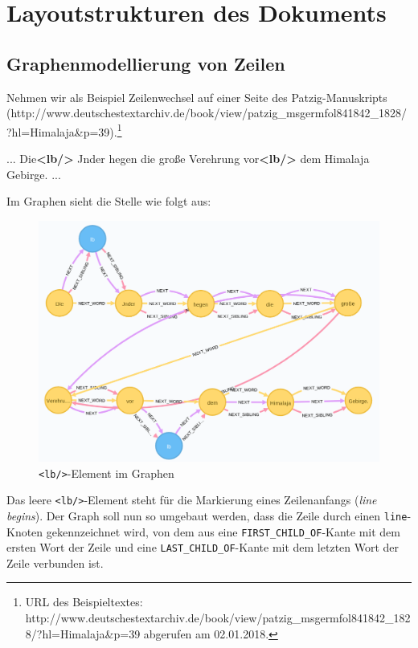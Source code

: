 \documentclass[ngerman,]{scrreprt}
\newenvironment{Shaded}{}{}
\newcommand{\KeywordTok}[1]{\textcolor[rgb]{0.00,0.44,0.13}{\textbf{#1}}}
\newcommand{\NormalTok}[1]{#1}
\begin{document}
\section{Layoutstrukturen des Dokuments}\label{layoutstrukturen-des-dokuments}

\subsection{Graphenmodellierung von Zeilen}\label{graphenmodellierung-von-zeilen}

Nehmen wir als Beispiel Zeilenwechsel auf einer Seite des Patzig-Manuskripts (http://www.deutschestextarchiv.de/book/view/patzig\_msgermfol841842\_1828/?hl=Himalaja\&p=39).\footnote{URL des Beispieltextes: http://www.deutschestextarchiv.de/book/view/patzig\_msgermfol841842\_1828/?hl=Himalaja\&p=39 abgerufen am 02.01.2018.}

\begin{Shaded}
\begin{Highlighting}[]
\NormalTok{... Die}\KeywordTok{<lb/>}
\NormalTok{Jnder hegen die große Verehrung vor}\KeywordTok{<lb/>}
\NormalTok{dem Himalaja Gebirge. ...}
\end{Highlighting}
\end{Shaded}

Im Graphen sieht die Stelle wie folgt aus:

\begin{figure}
\centering
\includegraphics{Bilder/TEI2Graph/lb-im-Graph2.png}
\caption{\texttt{\textless{}lb/\textgreater{}}-Element im Graphen}
\end{figure}

Das leere \texttt{\textless{}lb/\textgreater{}}-Element steht für die Markierung eines Zeilenanfangs (\emph{line begins}). Der Graph soll nun so umgebaut werden, dass die Zeile durch einen \texttt{line}-Knoten gekennzeichnet wird, von dem aus eine \texttt{FIRST\_CHILD\_OF}-Kante mit dem ersten Wort der Zeile und eine \texttt{LAST\_CHILD\_OF}-Kante mit dem letzten Wort der Zeile verbunden ist.
\end{document}
